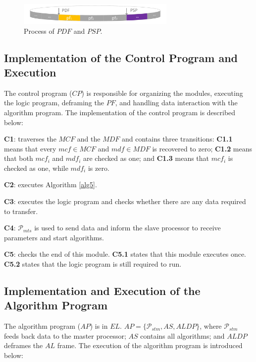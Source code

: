 \documentclass[journal,UTF8]{IEEEtran}
\begin{document}
	\begin{figure}
		\centering
		\includegraphics[width=3in]{fig/VisualInterface.pdf}
		\caption{ Process of $PDF$ and $PSP$. 
		}
		\label{fig:VisualInterface}
	\end{figure}
	
	
	
	\subsection{Implementation of the Control Program and Execution}
	The control program ($CP$) is responsible for organizing the modules, executing the logic program, deframing the $PF$, and handling data interaction with the algorithm program. The implementation of the control program is described below:
	
	\textbf{C1}: traverses the $MCF$ and the $MDF$ and contains three transitions: \textbf{C1.1} means that every $mcf\in MCF$ and $mdf \in MDF$ is recovered to zero; \textbf{C1.2} means that both $mcf_i$ and $mdf_i$ are checked as one; and \textbf{C1.3} means that $mcf_i$ is checked as one, while $mdf_i$ is zero.
	
	\textbf{C2}: executes Algorithm \ref{alg5}. 
	
	\textbf{C3}: executes the logic program and checks whether there are any data required to transfer.  
	
	\textbf{C4}: $\mathcal{P}_{mts}$ is used to send data and inform the slave processor to receive parameters and start algorithms.   
	
	\textbf{C5}: checks the end of this module. \textbf{C5.1} states that this module executes once. \textbf{C5.2} states that the logic program is still required to run.  
	
	\subsection{Implementation and Execution of the Algorithm Program }
	The algorithm program ($AP$) is in $EL$. $AP=\{\mathcal{P}_{stm}, AS, ALDP\}$, where $\mathcal{P}_{stm}$ feeds back data to the master processor; $AS$ contains all algorithms; and $ALDP$ deframes the $AL$ frame. The execution of the algorithm program is introduced below:
	
\end{document}
